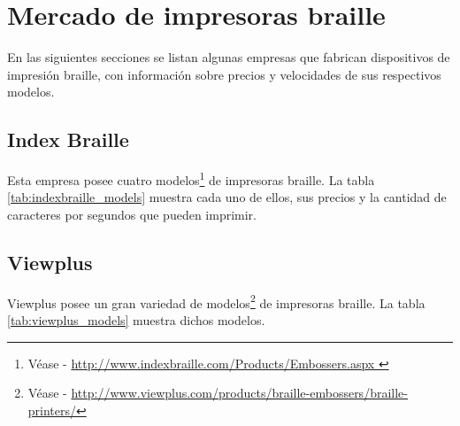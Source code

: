 \section{Mercado de impresoras braille}\label{cap:market}

En las siguientes secciones se listan algunas empresas que fabrican
dispositivos de impresi\'on braille, con informaci\'on sobre precios y
velocidades de sus respectivos modelos.

\subsection{Index Braille}
Esta empresa posee cuatro modelos\footnote{V\'ease
- \url{http://www.indexbraille.com/Products/Embossers.aspx }} de impresoras
braille. La tabla \ref{tab:indexbraille_models} muestra cada uno de ellos, sus
precios y la cantidad de caracteres por segundos que pueden imprimir.

\begin{table}[ht]
\centering
{}
\caption{Modelos de \emph{INDEX BRAILLE}} 
\label{tab:indexbraille_models}
\end{table}


\clearpage
\subsection{Viewplus}
Viewplus posee un gran variedad de modelos\footnote{V\'ease - 
\url{http://www.viewplus.com/products/braille-embossers/braille-printers/}} de
impresoras braille. La tabla \ref{tab:viewplus_models} muestra dichos modelos.

